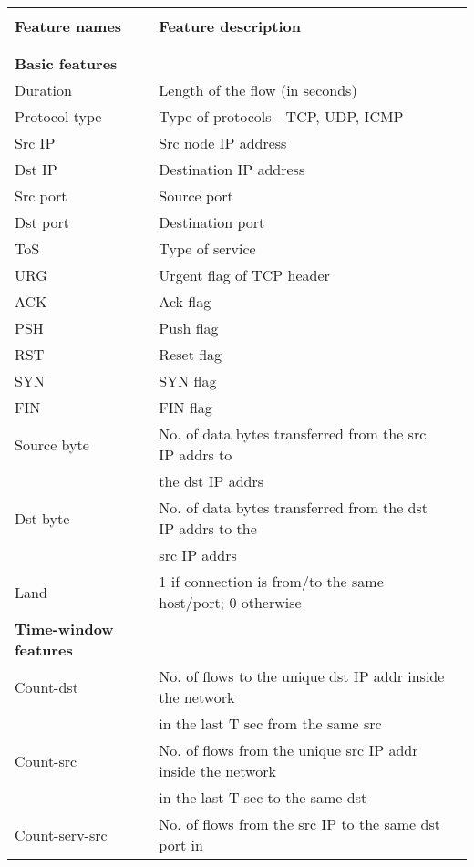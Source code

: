\centering
{\footnotesize
	\label{tab:tuidsFlow} 
	\begin{tabular}{llr}
		\hline
		&  \\
		\textbf{Feature names}    & \textbf{Feature description} \\
		&  \\
		\hline
		&  \\
		\textbf{Basic features} & \\
		Duration & Length of the flow (in seconds)\\
		Protocol-type & Type of protocols - TCP, UDP, ICMP \\
		Src IP & Src node IP address\\
		Dst IP & Destination IP address\\
		Src port & Source port\\
		Dst port & Destination port\\
		ToS & Type of service\\
		URG & Urgent flag of TCP header\\
		ACK & Ack flag\\
		PSH & Push flag\\
		RST & Reset flag\\
		SYN & SYN flag\\
		FIN & FIN flag\\
		Source byte & No. of data bytes transferred from the src IP addrs to\\
		&  the dst IP addrs\\
		Dst byte & No. of data bytes transferred from the dst IP addrs to the\\
		&  src IP addrs\\
		Land & 1 if connection is from/to the same host/port; 0 otherwise\\
		\textbf{Time-window features} & \\
		Count-dst & No. of flows to the unique dst IP addr inside the network\\
		&  in the last T sec from the same src\\
		Count-src & No. of flows from the unique src IP addr inside the network\\
		&  in the last T sec to the same dst\\
		Count-serv-src & No. of flows from the src IP to the same dst port in \\

\end{tabular}}
